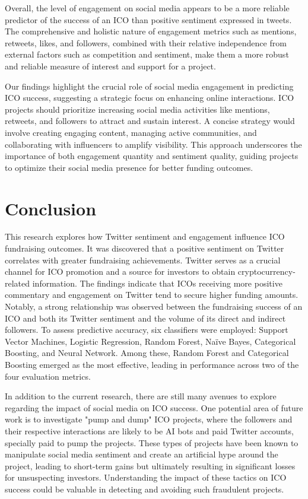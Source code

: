 \documentclass[runningheads]{llncs}
\begin{document}
Overall, the level of engagement on social media appears to be a more reliable predictor of the success of an ICO than positive sentiment expressed in tweets. The comprehensive and holistic nature of engagement metrics such as mentions, retweets, likes, and followers, combined with their relative independence from external factors such as competition and sentiment, make them a more robust and reliable measure of interest and support for a project.

Our findings highlight the crucial role of social media engagement in predicting ICO success, suggesting a strategic focus on enhancing online interactions. ICO projects should prioritize increasing social media activities like mentions, retweets, and followers to attract and sustain interest. A concise strategy would involve creating engaging content, managing active communities, and collaborating with influencers to amplify visibility. This approach underscores the importance of both engagement quantity and sentiment quality, guiding projects to optimize their social media presence for better funding outcomes.

\section{Conclusion}


This research explores how Twitter sentiment and engagement influence ICO fundraising outcomes. It was discovered that a positive sentiment on Twitter correlates with greater fundraising achievements. Twitter serves as a crucial channel for ICO promotion and a source for investors to obtain cryptocurrency-related information. The findings indicate that ICOs receiving more positive commentary and engagement on Twitter tend to secure higher funding amounts. Notably, a strong relationship was observed between the fundraising success of an ICO and both its Twitter sentiment and the volume of its direct and indirect followers. To assess predictive accuracy, six classifiers were employed: Support Vector Machines, Logistic Regression, Random Forest, Naïve Bayes, Categorical Boosting, and Neural Network. Among these, Random Forest and Categorical Boosting emerged as the most effective, leading in performance across two of the four evaluation metrics.

In addition to the current research, there are still many avenues to explore regarding the impact of social media on ICO success. One potential area of future work is to investigate "pump and dump" ICO projects, where the followers and their respective interactions are likely to be AI bots and paid Twitter accounts, specially paid to pump the projects. These types of projects have been known to manipulate social media sentiment and create an artificial hype around the project, leading to short-term gains but ultimately resulting in significant losses for unsuspecting investors. Understanding the impact of these tactics on ICO success could be valuable in detecting and avoiding such fraudulent projects.
\end{document}
